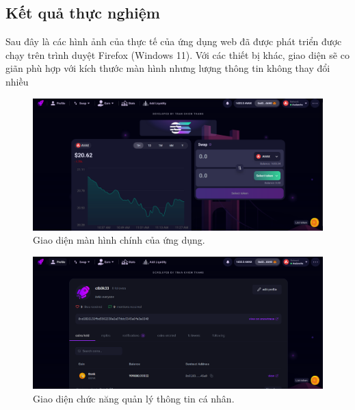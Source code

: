 \subsection{Kết quả thực nghiệm}
Sau đây là các hình ảnh của thực tế của ứng dụng web đã được phát triển được
chạy trên trình duyệt Firefox (Windows 11). Với các thiết bị khác, giao diện sẽ
co giãn phù hợp với kích thước màn hình nhưng lượng thông tin không thay đổi
nhiều

\begin{figure}[H]
  \centering
  \includegraphics[width=1\textwidth]{figures/c3/MainScreenRel.png}
  \caption{Giao diện màn hình chính của ứng dụng.}
  \label{fig:architecture-diagram}
\end{figure}

\begin{figure}[H]
  \centering
  \includegraphics[width=1\textwidth]{figures/c3/UserProfileRel.png}
  \caption{Giao diện chức năng quản lý thông tin cá nhân.}
  \label{fig:architecture-diagram}
\end{figure}

